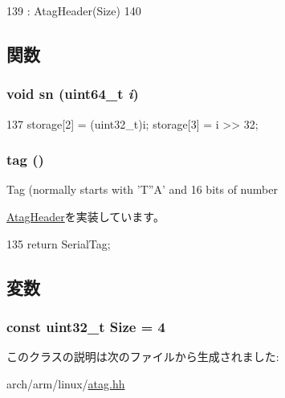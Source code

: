 \begin{DoxyCode}
139         : AtagHeader(Size)
140     {}
\end{DoxyCode}


\subsection{関数}
\hypertarget{classAtagSerial_a02ff72ae6f344cd5693c2db7911e05e7}{
\subsubsection[{sn}]{\setlength{\rightskip}{0pt plus 5cm}void sn (uint64\_\-t {\em i})}}
\label{classAtagSerial_a02ff72ae6f344cd5693c2db7911e05e7}



\begin{DoxyCode}
137 { storage[2] = (uint32_t)i; storage[3] = i >> 32; }
\end{DoxyCode}
\hypertarget{classAtagSerial_afe29fbb80b1d2765e37e98c6d259ea52}{
\subsubsection[{tag}]{ tag ()}}
\label{classAtagSerial_afe29fbb80b1d2765e37e98c6d259ea52}
Tag (normally starts with 'T''A' and 16 bits of number 

\hyperlink{classAtagHeader_adad80b4c3e973afddab9e70f05faecd9}{AtagHeader}を実装しています。


\begin{DoxyCode}
135 { return SerialTag; }
\end{DoxyCode}


\subsection{変数}
\hypertarget{classAtagSerial_a7ecea14dd0f3277e19580d4509fafdba}{
\subsubsection[{Size}]{\setlength{\rightskip}{0pt plus 5cm}const {\bf uint32\_\-t} {\bf Size} = 4}}
\label{classAtagSerial_a7ecea14dd0f3277e19580d4509fafdba}


このクラスの説明は次のファイルから生成されました:\begin{DoxyCompactItemize}
\item 
arch/arm/linux/\hyperlink{atag_8hh}{atag.hh}\end{DoxyCompactItemize}
